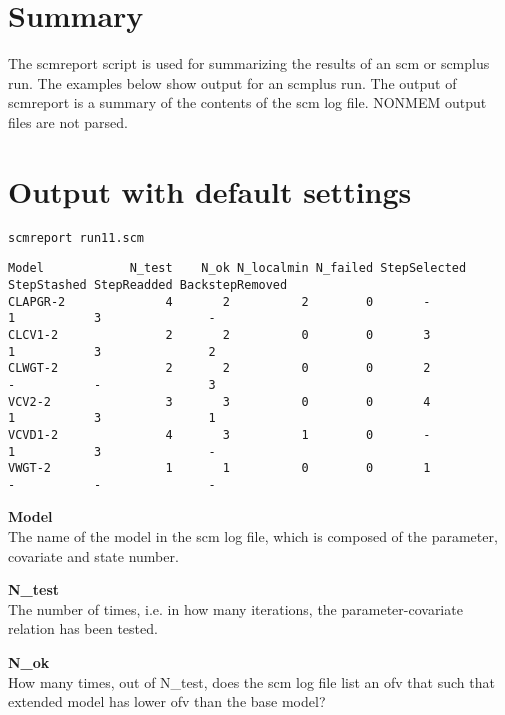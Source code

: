 



\maketitle
\newcommand{\guidetoolname}{scmreport}
\tableofcontents
\newpage


\section{Summary}
The scmreport script is used for summarizing the results of an scm or scmplus run.
The examples below show output for an scmplus run.
The output of scmreport is a summary of the contents of the scm log file. 
NONMEM output files are not parsed. 

\section{Output with default settings}
\begin{verbatim}
scmreport run11.scm
\end{verbatim}
{\tiny
\begin{verbatim}
Model            N_test    N_ok N_localmin N_failed StepSelected StepStashed StepReadded BackstepRemoved
CLAPGR-2              4       2          2        0       -           1           3               -
CLCV1-2               2       2          0        0       3           1           3               2
CLWGT-2               2       2          0        0       2           -           -               3
VCV2-2                3       3          0        0       4           1           3               1
VCVD1-2               4       3          1        0       -           1           3               -
VWGT-2                1       1          0        0       1           -           -               -
\end{verbatim}
}


{\bfseries Model}\\
The name of the model in the scm log file, which is composed of the parameter, covariate and state number.

{\bfseries N\_test}\\
The number of times, i.e. in how many iterations, 
the parameter-covariate relation has been tested.

{\bfseries N\_ok}\\
How many times, out of N\_test, does the scm log file list an ofv that such that extended model
has lower ofv than the base model?

